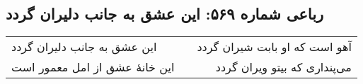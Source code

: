 \begin{center}
\section*{رباعی شماره ۵۶۹: این عشق به جانب دلیران گردد}
\label{sec:0569}
\begin{longtable}{l p{0.5cm} r}
این عشق به جانب دلیران گردد
&&
آهو است که او بابت شیران گردد
\\
این خانهٔ عشق از امل معمور است
&&
می‌پنداری که بیتو ویران گردد
\\
\end{longtable}
\end{center}
